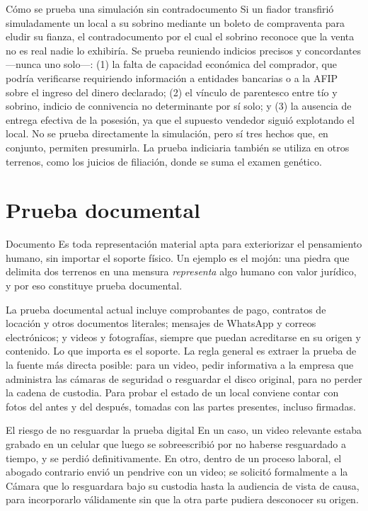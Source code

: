 \documentclass[12pt,oneside]{book}
\begin{document}
\begin{example}{Cómo se prueba una simulación sin contradocumento}
Si un fiador transfirió simuladamente un local a su sobrino mediante un boleto de compraventa para eludir su fianza, el contradocumento por el cual el sobrino reconoce que la venta no es real nadie lo exhibiría. Se prueba reuniendo indicios precisos y concordantes ---nunca uno solo---: (1) la falta de capacidad económica del comprador, que podría verificarse requiriendo información a entidades bancarias o a la AFIP sobre el ingreso del dinero declarado; (2) el vínculo de parentesco entre tío y sobrino, indicio de connivencia no determinante por sí solo; y (3) la ausencia de entrega efectiva de la posesión, ya que el supuesto vendedor siguió explotando el local. No se prueba directamente la simulación, pero sí tres hechos que, en conjunto, permiten presumirla. La prueba indiciaria también se utiliza en otros terrenos, como los juicios de filiación, donde se suma el examen genético.
\end{example}

\section{Prueba documental}

\begin{definition}{Documento}
Es toda representación material apta para exteriorizar el pensamiento humano, sin importar el soporte físico. Un ejemplo es el mojón: una piedra que delimita dos terrenos en una mensura \emph{representa} algo humano con valor jurídico, y por eso constituye prueba documental.
\end{definition}

La prueba documental actual incluye comprobantes de pago, contratos de locación y otros documentos literales; mensajes de WhatsApp y correos electrónicos; y videos y fotografías, siempre que puedan acreditarse en su origen y contenido. Lo que importa es el soporte. La regla general es extraer la prueba de la fuente más directa posible: para un video, pedir informativa a la empresa que administra las cámaras de seguridad o resguardar el disco original, para no perder la cadena de custodia. Para probar el estado de un local conviene contar con fotos del antes y del después, tomadas con las partes presentes, incluso firmadas.

\begin{example}{El riesgo de no resguardar la prueba digital}
En un caso, un video relevante estaba grabado en un celular que luego se sobreescribió por no haberse resguardado a tiempo, y se perdió definitivamente. En otro, dentro de un proceso laboral, el abogado contrario envió un pendrive con un video; se solicitó formalmente a la Cámara que lo resguardara bajo su custodia hasta la audiencia de vista de causa, para incorporarlo válidamente sin que la otra parte pudiera desconocer su origen.
\end{example}
\end{document}
